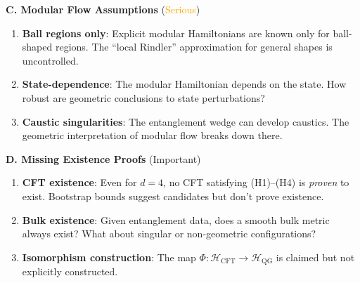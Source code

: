 \documentclass[12pt,a4paper]{article}
\begin{document}
\begin{tcolorbox}[colback=red!5!white, colframe=red!75!black, title=\textbf{RED TEAM Round 2: Proof-Specific Critiques}]
\textbf{C. Modular Flow Assumptions} (\textcolor{orange}{Serious})

\begin{enumerate}[resume, label=\textbf{R2.\arabic*.}]
    \item \textbf{Ball regions only}: Explicit modular Hamiltonians are known only for ball-shaped regions. The ``local Rindler'' approximation for general shapes is uncontrolled.
    
    \item \textbf{State-dependence}: The modular Hamiltonian depends on the state. How robust are geometric conclusions to state perturbations?
    
    \item \textbf{Caustic singularities}: The entanglement wedge can develop caustics. The geometric interpretation of modular flow breaks down there.
\end{enumerate}

\textbf{D. Missing Existence Proofs} (\textcolor{yellow!80!black}{Important})

\begin{enumerate}[resume, label=\textbf{R2.\arabic*.}]
    \item \textbf{CFT existence}: Even for $d=4$, no CFT satisfying (H1)--(H4) is \emph{proven} to exist. Bootstrap bounds suggest candidates but don't prove existence.
    
    \item \textbf{Bulk existence}: Given entanglement data, does a smooth bulk metric always exist? What about singular or non-geometric configurations?
    
    \item \textbf{Isomorphism construction}: The map $\Phi: \mathcal{H}_{\text{CFT}} \to \mathcal{H}_{\text{QG}}$ is claimed but not explicitly constructed.
\end{enumerate}

\end{tcolorbox}

\vspace{1em}
\end{document}
